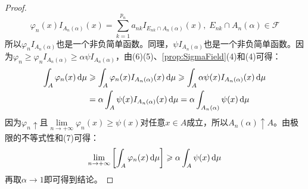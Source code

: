 \begin{proof}
	\begin{equation*}
		\varphi_n(x)I_{A_n(\alpha)}(x)=\sum_{k=1}^{p_n}a_{nk}I_{E_{nk}\cap A_n(\alpha)}(x),\;E_{nk}\cap A_n(\alpha)\in \mathscr{F}
	\end{equation*}
	所以$\varphi_nI_{A_n(\alpha)}$也是一个非负简单函数。同理，$\psi I_{A_n(\alpha)}$也是一个非负简单函数。因为$\varphi_n\geqslant\varphi_nI_{A_n(\alpha)}\geqslant\alpha\psi I_{A_n(\alpha)}$，由(6)(5)、\cref{prop:SigmaField}(4)和(4)可得：
	\begin{align*}
		\int_{A}\varphi_n(x)\mathop{}\!\mathrm{d}\mu
		&\geqslant\int_{A}\varphi_n(x)I_{A_n(\alpha)}(x)\mathop{}\!\mathrm{d}\mu\geqslant\int_{A}\alpha\psi(x)I_{A_n(\alpha)}(x)\mathop{}\!\mathrm{d}\mu \\
		&=\alpha\int_{A}\psi(x)I_{A_n(\alpha)}(x)\mathop{}\!\mathrm{d}\mu=\alpha\int_{A_n(\alpha)}\psi(x)\mathop{}\!\mathrm{d}\mu
	\end{align*}
	因为$\varphi_n\uparrow$且$\lim\limits_{n\to+\infty}\varphi_n(x)\geqslant\psi(x)$对任意$x\in A$成立，所以$A_n(\alpha)\uparrow A$。由极限的不等式性和(7)可得：
	\begin{equation*}
		\lim_{n\to+\infty}\left[\int_{A}\varphi_n(x)\mathop{}\!\mathrm{d}\mu\right]\geqslant\alpha\int_{A}\psi(x)\mathop{}\!\mathrm{d}\mu
	\end{equation*}
	再取$\alpha\to 1$即可得到结论。
\end{proof}

